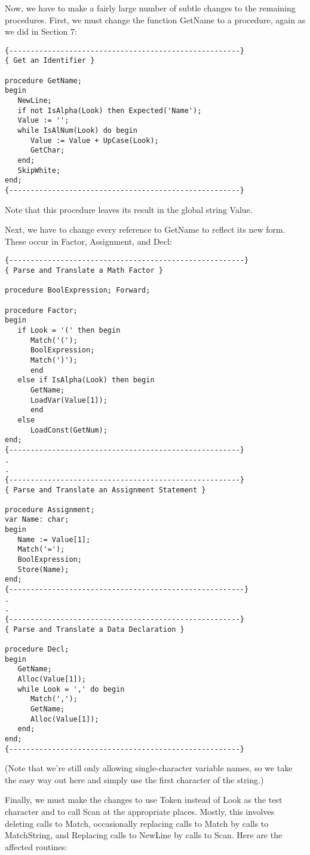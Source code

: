 Now, we have to make a  fairly  large number of subtle changes to the remaining procedures. First, we  must  change  the function GetName to a procedure, again as we did in Section 7:


\begin{verbatim}
{------------------------------------------------------}
{ Get an Identifier }

procedure GetName;
begin
   NewLine;
   if not IsAlpha(Look) then Expected('Name');
   Value := '';
   while IsAlNum(Look) do begin
      Value := Value + UpCase(Look);
      GetChar;
   end;
   SkipWhite;
end;
{------------------------------------------------------}
\end{verbatim}

Note that this procedure leaves its result in  the  global string Value.

Next, we have to change every reference to GetName to reflect its new form. These occur in Factor, Assignment, and Decl:

\begin{verbatim}
{-------------------------------------------------------}
{ Parse and Translate a Math Factor }

procedure BoolExpression; Forward;

procedure Factor;
begin
   if Look = '(' then begin
      Match('(');
      BoolExpression;
      Match(')');
      end
   else if IsAlpha(Look) then begin
      GetName;
      LoadVar(Value[1]);
      end
   else
      LoadConst(GetNum);
end;
{------------------------------------------------------}
.
.
{------------------------------------------------------}
{ Parse and Translate an Assignment Statement }

procedure Assignment;
var Name: char;
begin
   Name := Value[1];
   Match('=');
   BoolExpression;
   Store(Name);
end;
{-------------------------------------------------------}
.
.
{------------------------------------------------------}
{ Parse and Translate a Data Declaration }

procedure Decl;
begin
   GetName;
   Alloc(Value[1]);
   while Look = ',' do begin
      Match(',');
      GetName;
      Alloc(Value[1]);
   end;
end;
{------------------------------------------------------}
\end{verbatim}

(Note that we're still  only  allowing  single-character variable names, so we take the easy way out here and simply use the first character of the string.)

Finally, we must make the changes to use Token instead of Look as the  test  character  and to call Scan at the appropriate places. Mostly, this  involves  deleting  calls  to  Match, occasionally replacing calls to  Match  by calls to MatchString, and Replacing calls  to  NewLine  by  calls  to  Scan. Here are the affected routines:

